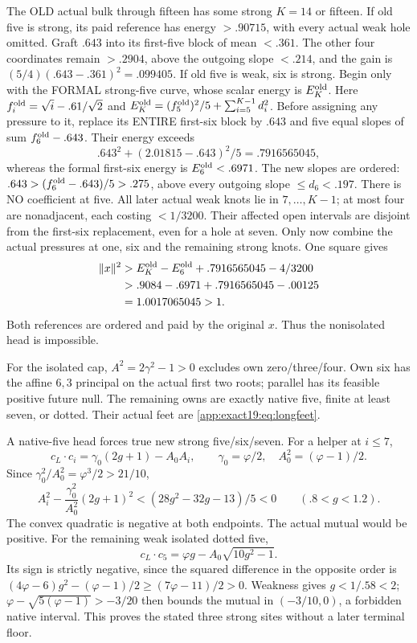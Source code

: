 \documentclass[11pt]{article}
\theoremstyle{definition}
\theoremstyle{remark}
\begin{document}
The OLD actual bulk through fifteen
has some strong \(K=14\) or fifteen.
If old five is strong, its paid
reference has energy \(>.90715\),
with every actual weak hole omitted.
Graft
\(.643\) into its first-five block
of mean \(<.361\).
The other four coordinates remain
\(>.2904\), above the outgoing
slope \(<.214\), and the gain is
\((5/4)(.643-.361)^2=.099405\).
If old five is weak, six is strong.
Begin only with the FORMAL
strong-five curve, whose scalar
energy is \(E_K^{\rm old}\).
Here \(f_i^{\rm old}=\sqrt i-.61/\sqrt2\)
and \(E_K^{\rm old}=(f_5^{\rm old})^2/5
+\sum_{i=5}^{K-1}d_i^2\).
Before assigning any pressure to
it, replace its ENTIRE first-six
block by \(.643\) and five equal
slopes of sum \(f_6^{\rm old}-.643\).
Their energy exceeds
\[
 .643^2+(2.01815-.643)^2/5=.7916565045 ,
\]
whereas the formal first-six
energy is \(E_6^{\rm old}<.6971\).
The new slopes are ordered:
\(.643>(f_6^{\rm old}-.643)/5>.275\),
above every outgoing slope
\(\le d_6<.197\).
There is NO coefficient at five.
All later actual weak knots lie
in \(7,\ldots,K-1\); at most four
are nonadjacent, each costing
\(<1/3200\).
Their affected open intervals
are disjoint from the first-six
replacement, even for a hole
at seven.
Only now combine the actual
pressures at one, six and the
remaining strong knots.
One square gives
\[
\begin{aligned}
 \|x\|^2&>E_K^{\rm old}-E_6^{\rm old}+.7916565045-4/3200\\
 &>.9084-.6971+.7916565045-.00125\\
 &=1.0017065045>1 .
\end{aligned}
\]
Both references are ordered and
paid by the original \(x\).
Thus the nonisolated head is
impossible.

For the isolated cap,
\(A^2=2\gamma^2-1>0\) excludes
own zero/three/four.
Own six has the affine \(6,3\)
principal on the actual first two
roots; parallel has its feasible
positive future null.
The remaining owns are exactly
native five, finite at least seven,
or dotted.
Their actual feet are
\eqref{app:exact19:eq:longfeet}.

A native-five head forces true
new strong five/six/seven.
For a helper at \(i\le7\),
\[
 c_L\cdot c_i=\gamma_0(2g+1)-A_0A_i,\qquad
       \gamma_0=\varphi/2,\quad A_0^2=(\varphi-1)/2 .
\]
Since \(\gamma_0^2/A_0^2=\varphi^3/2>21/10\),
\[
 A_i^2-\frac{\gamma_0^2}{A_0^2}(2g+1)^2
                   <(28g^2-32g-13)/5<0
                  \qquad(.8<g<1.2).
\]
The convex quadratic is negative
at both endpoints.
The actual mutual would be
positive.
For the remaining weak isolated
dotted five,
\[
 c_L\cdot c_5=\varphi g-A_0\sqrt{10g^2-1}.
\]
Its sign is strictly negative,
since the squared difference in
the opposite order is
\((4\varphi-6)g^2-(\varphi-1)/2
\ge(7\varphi-11)/2>0\).
Weakness gives \(g<1/.58<2\);
\(\varphi-\sqrt{5(\varphi-1)}>-3/20\)
then bounds the mutual in
\((-3/10,0)\), a forbidden native
interval.
This proves the stated three
strong sites without a later
terminal floor.
\end{document}
